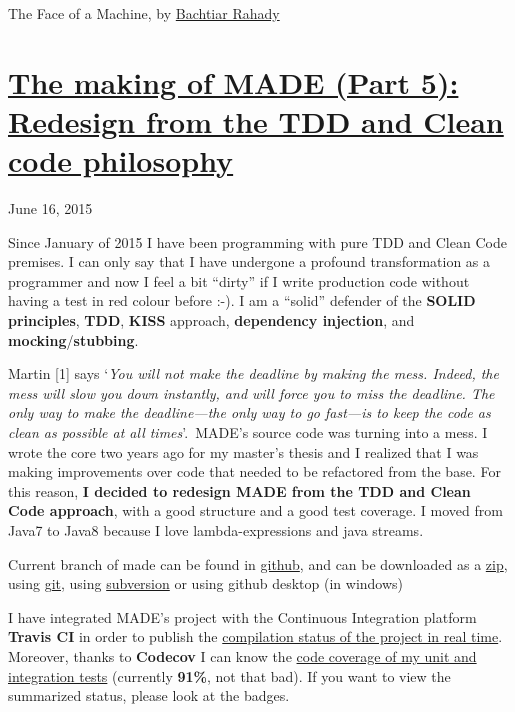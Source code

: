 \documentclass[a4paper]{article}
\newcommand\textstyleStrongEmphasis[1]{\textbf{#1}}
\begin{document}
The Face of a Machine, by
\href{https://www.flickr.com/photos/rahady/}{Bachtiar Rahady}
\clearpage\section[The making of MADE (Part 5): Redesign from the TDD
and Clean code
philosophy]{\href{http://www.velonuboso.com/made/2015/06/16/making-part-5-redesign-tdd-clean-code-philosophy/}{The
making of MADE (Part 5): Redesign from the TDD and Clean code
philosophy}}
June 16, 2015

Since January of 2015 I have been programming with pure TDD and Clean
Code premises. I can only say that I have undergone a profound
transformation as a programmer and now I feel a bit
{\textquotedblleft}dirty{\textquotedblright} if I write production code
without having a test in red colour before :-). I am a
{\textquotedblleft}solid{\textquotedblright} defender of the
\textstyleStrongEmphasis{SOLID principles},
\textstyleStrongEmphasis{TDD}, \textstyleStrongEmphasis{KISS} approach,
\textstyleStrongEmphasis{dependency injection}, and
\textstyleStrongEmphasis{mocking}/\textstyleStrongEmphasis{stubbing}.

Martin [1] says {\textquoteleft}\textit{You will not make the deadline
by making the mess. Indeed, the mess will slow you down instantly, and
will force you to miss the deadline. The only way to make the
deadline---the only way to go fast---is to keep the code as clean as
possible at all times}{\textquoteright}.~MADE{\textquoteright}s source
code was turning into a mess. I wrote the core two years ago for my
master{\textquoteright}s thesis and I realized that I was making
improvements over code that needed to be refactored from the base. For
this reason, \textstyleStrongEmphasis{I decided to redesign MADE from
the TDD and Clean Code approach}, with a good structure and a good test
coverage. I moved from Java7 to Java8 because I love lambda-expressions
and java streams.

Current branch of made can be found in
\href{https://github.com/raiben/made}{github}, and can be downloaded as
a \href{https://github.com/raiben/made/archive/master.zip}{zip}, using
\href{https://github.com/raiben/made.git}{git}, using
\href{https://github.com/raiben/made}{subversion} or using github
desktop (in windows)

I have integrated MADE{\textquoteright}s project with the Continuous
Integration platform \textbf{Travis CI} in order to publish the
\href{https://travis-ci.org/raiben/made}{compilation status of the
project in real time}. Moreover, thanks to \textbf{Codecov} I can know
the \href{https://codecov.io/github/raiben/made?branch=master}{code
coverage of my unit and integration tests} (currently \textbf{91\%},
not that bad). If you want to view the summarized status, please look
at the badges.
\end{document}
